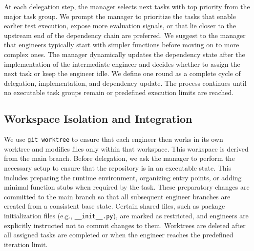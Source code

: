 
At each delegation step, the manager selects next tasks with top priority from the major task group. We prompt the manager to prioritize the tasks that enable earlier test execution, expose more evaluation signals, or that lie closer to the upstream end of the dependency chain are preferred. We suggest to the manager that engineers typically start with simpler functions before moving on to more complex ones. The manager dynamically updates the dependency state after the implementation of the intermediate engineer and decides whether to assign the next task or keep the engineer idle. We define one round as a complete cycle of delegation, implementation, and dependency update. The process continues until no executable task groups remain or predefined execution limits are reached.




\subsection{Workspace Isolation and Integration}
\label{sec:iso-int}
We use \texttt{git worktree} to ensure that each engineer then works in its own worktree and modifies files only within that workspace. This workspace is derived from the main branch. Before delegation, we ask the manager to perform the necessary setup to ensure that the repository is in an executable state. This includes preparing the runtime environment, organizing entry points, or adding minimal function stubs when required by the task. These preparatory changes are committed to the main branch so that all subsequent engineer branches are created from a consistent base state. Certain shared files, such as package initialization files (e.g., \texttt{\_\_init\_\_.py}), are marked as restricted, and engineers are explicitly instructed not to commit changes to them. Worktrees are deleted after all assigned tasks are completed or when the engineer reaches the predefined iteration limit.

